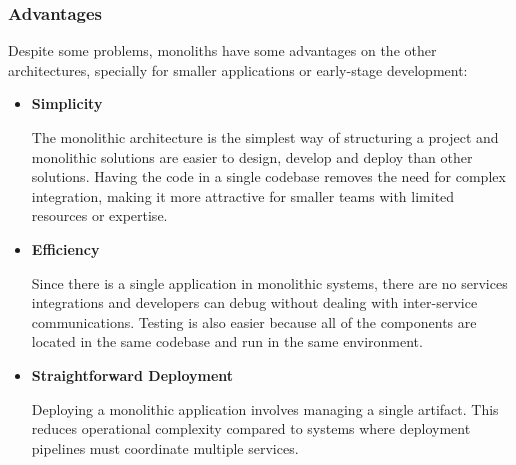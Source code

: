 \subsubsection{Advantages}
Despite some problems, monoliths have some advantages on the other architectures,
specially for smaller applications or early-stage development:
\begin{itemize}
	\item \textbf{Simplicity}

	      The monolithic architecture is the simplest way of structuring a
	      project and monolithic solutions are easier to design, develop and deploy
	      than other solutions.
	      Having the code in a single codebase removes the need for complex
	      integration, making it more attractive for smaller teams with limited
	      resources or expertise\cite{IBMMonolith}.
	\item \textbf{Efficiency}

	      Since there is a single application in monolithic systems, there are no
	      services integrations and developers can debug without dealing with
	      inter-service communications. Testing is also easier because all of the
	      components are located in the same codebase and run in the same environment\cite{newman2019monolith}.
	\item \textbf{Straightforward Deployment}

	      Deploying a monolithic application involves managing a single artifact. This
	      reduces operational complexity compared to systems where deployment
	      pipelines must coordinate multiple services\cite{AWSMonolithMicroservices}.
\end{itemize}
